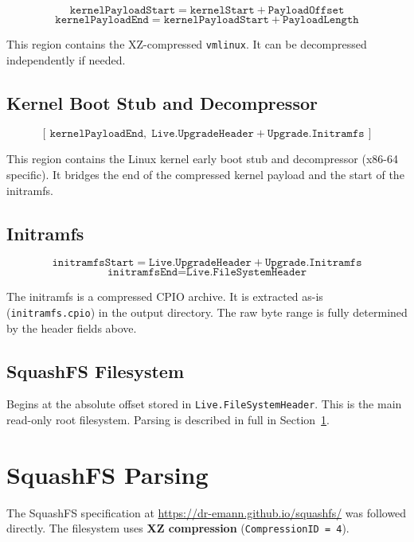 \documentclass[11pt,a4paper]{article}
\begin{document}
\[
  \texttt{kernelPayloadStart} = \texttt{kernelStart} + \texttt{PayloadOffset}
\]
\[
  \texttt{kernelPayloadEnd} = \texttt{kernelPayloadStart} + \texttt{PayloadLength}
\]

This region contains the XZ-compressed \texttt{vmlinux}. It can be
decompressed independently if needed.

\subsection{Kernel Boot Stub and Decompressor }

\[
  [\,\texttt{kernelPayloadEnd},\;
     \texttt{Live.UpgradeHeader} + \texttt{Upgrade.Initramfs}\,]
\]

This region contains the Linux kernel early boot stub and decompressor
(x86-64 specific). It bridges the end of the compressed kernel payload
and the start of the initramfs.

\subsection{Initramfs}

\[
  \texttt{initramfsStart} = \texttt{Live.UpgradeHeader} + \texttt{Upgrade.Initramfs}
\]
\[
  \texttt{initramfsEnd} = \texttt{Live.FileSystemHeader}
\]

The initramfs is a compressed CPIO archive. It is extracted as-is
(\texttt{initramfs.cpio}) in the output directory. The raw byte range is
fully determined by the header fields above.

\subsection{SquashFS Filesystem}

Begins at the absolute offset stored in \texttt{Live.FileSystemHeader}.
This is the main read-only root filesystem. Parsing is described in full
in Section~\ref{sec:squashfs}.

\section{SquashFS Parsing}
\label{sec:squashfs}

The SquashFS specification at
\url{https://dr-emann.github.io/squashfs/} was followed directly.
The filesystem uses \textbf{XZ compression} (\texttt{CompressionID = 4}).
\end{document}
